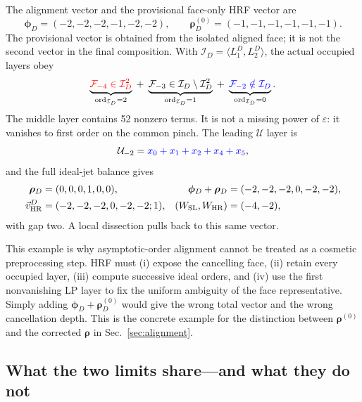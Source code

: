 \documentclass[a4paper,11pt]{article}
\newcommand{\WSL}{W_{\rm SL}}
\newcommand{\WHR}{W_{\rm HR}}
\newcommand{\vHR}{\vec v_{\rm HR}}
\newcommand{\ideal}{\mathcal I}
\newcommand{\SLcolour}[1]{{\color{red}#1}}
\newcommand{\HRcolour}[1]{{\color{blue}#1}}
\newcommand{\Othercolour}[1]{{\color{black}#1}}
\begin{document}
The alignment vector and the provisional face-only HRF vector are
\begin{equation}
 \boldsymbol\phi_D=(-2,-2,-2,-1,-2,-2),\qquad
 \boldsymbol\rho_D^{(0)}=(-1,-1,-1,-1,-1,-1).
 \label{eq:dsc-discovery-vectors}
\end{equation}
The provisional vector is obtained from the isolated aligned face; it is not
the second vector in the final composition.  With
\(\ideal_D=\langle L_1^D,L_2^D\rangle\), the actual occupied layers obey
\begin{equation}
 \underbrace{\SLcolour{\mathcal F_{-4}\in\ideal_D^2}}_{
  \operatorname{ord}_{\ideal_D}=2}
 \; +\;
 \underbrace{\Othercolour{\mathcal F_{-3}\in\ideal_D\setminus\ideal_D^2}}_{
  \operatorname{ord}_{\ideal_D}=1}
 \; +\;
 \underbrace{\HRcolour{\mathcal F_{-2}\notin\ideal_D}}_{
  \operatorname{ord}_{\ideal_D}=0}.
 \label{eq:dsc-two-layer-colours}
\end{equation}
The middle layer contains 52 nonzero terms.  It is not a missing power of
\(\varepsilon\): it vanishes to first order on the common pinch.  The leading
\(\mathcal U\) layer is
\begin{equation}
 \mathcal U_{-2}=\HRcolour{x_0+x_1+x_2+x_4+x_5},
 \label{eq:dsc-U-leading}
\end{equation}
and the full ideal-jet balance gives
\begin{align}
 \boldsymbol\rho_D&=(0,0,0,1,0,0),&
 \boldsymbol\phi_D+\boldsymbol\rho_D
   &=(-2,-2,-2,0,-2,-2),\nonumber\\
 \vHR^D&=(-2,-2,-2,0,-2,-2;1),&
 (\WSL,\WHR)&=(-4,-2),
 \label{eq:dsc-vector-example}
\end{align}
with gap two.  A local dissection pulls back to this same vector.

This example is why asymptotic-order alignment cannot be treated as a
cosmetic preprocessing step.  HRF must (i) expose the cancelling face,
(ii) retain every occupied layer, (iii) compute successive ideal orders,
and (iv) use the first nonvanishing LP layer to fix the uniform ambiguity of
the face representative.  Simply adding
\(\boldsymbol\phi_D+\boldsymbol\rho_D^{(0)}\) would give the wrong total
vector and the wrong cancellation depth.  This is the concrete example for
the distinction between \(\boldsymbol\rho^{(0)}\) and the corrected
\(\boldsymbol\rho\) in Sec.~\ref{sec:alignment}.

\subsection{What the two limits share---and what they do not}
\end{document}
